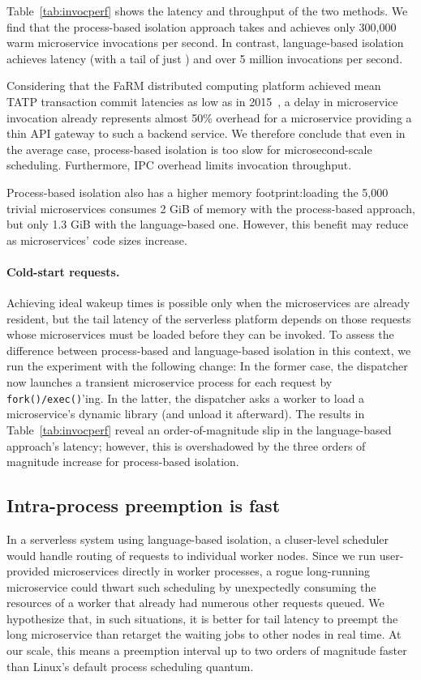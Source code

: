 Table~\ref{tab:invocperf} shows the latency and throughput of the two
methods.  We find that the process-based isolation approach takes  and achieves
only 300,000 warm microservice invocations per second. In contrast, language-based
isolation achieves  latency (with a tail of just ) and over 5 million
invocations per second.

Considering that the FaRM distributed computing platform
achieved mean TATP transaction commit latencies as low as
 in 2015~\cite{Dragojevic:sosp2015}, a  delay in microservice invocation
already represents almost 50\% overhead for a microservice providing a thin API
gateway to such a backend service.  We therefore conclude that even in the average
case, process-based isolation is too slow for microsecond-scale scheduling.
Furthermore, IPC overhead limits invocation throughput.

Process-based isolation also has a higher memory footprint:\@ loading the 5,000
trivial microservices consumes 2 GiB of memory with the process-based approach, but
only 1.3 GiB with the language-based one.  However, this benefit may reduce as
microservices' code sizes increase.

\paragraph{Cold-start requests.}
Achieving ideal wakeup times is possible only when the microservices are
already resident, but the tail latency of the serverless platform depends on
those requests whose microservices must be loaded
before they can be invoked.  To assess the difference between process-based and
language-based isolation in this context, we run the experiment with the following
change:  In the former case, the dispatcher now launches a transient
microservice process for each request by \texttt{fork()/exec()}'ing.  In the latter,
the dispatcher asks a worker to load a microservice's dynamic library (and
unload it afterward).  The results in Table~\ref{tab:invocperf} reveal an
order-of-magnitude slip in the language-based approach's latency; however, this is
overshadowed by the three orders of magnitude increase for process-based
isolation.

\subsection{Intra-process preemption is fast}
In a serverless system using language-based isolation, a cluser-level scheduler would
handle routing of requests to individual worker nodes.  Since we run user-provided
microservices directly in worker processes, a rogue long-running microservice could
thwart such scheduling by unexpectedly consuming the resources of a worker that
already had numerous other requests queued.  We hypothesize that, in such situations,
it is better for tail latency to preempt the long microservice than retarget the
waiting jobs to other nodes in real time.  At our scale, this means a preemption
interval up to two orders of magnitude faster than Linux's default  process
scheduling quantum.

